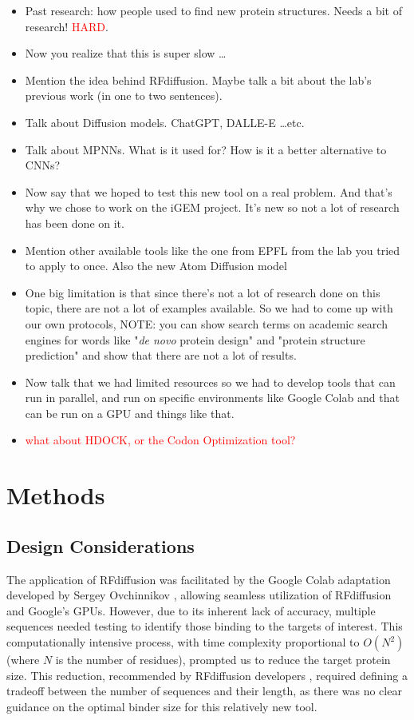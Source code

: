 \documentclass[11pt,a4paper]{article}
\begin{document}
\begin{itemize}
    \item Past research: how people used to find new protein 
    structures. Needs a bit of research! \textcolor{red}{HARD}.
    \item Now you realize that this is super slow \ldots
    \item Mention the idea behind RFdiffusion. Maybe talk a bit about 
    the lab's previous work (in one to two sentences).
    \item Talk about Diffusion models. ChatGPT, DALLE-E \ldots etc.
    \item Talk about MPNNs. What is it used for? How is it a better 
    alternative to CNNs?
    \item Now say that we hoped to test this new tool on a real 
    problem. And that's why we chose to work on the iGEM project. It's 
    new so not a lot of research has been done on it.
    \item Mention other available tools like the one from EPFL from the 
    lab you tried to apply to once. Also the new Atom Diffusion model
    \item One big limitation is that since there's not a lot of research 
    done on this topic, there are not a lot of examples available. So we 
    had to come up with our own protocols, NOTE: you can show search 
    terms on academic search engines for words like "\emph{de novo} protein 
    design" and "protein structure prediction" and show that there are 
    not a lot of results.
    \item Now talk that we had limited resources so we had to develop 
    tools that can run in parallel, and run on specific environments like 
    Google Colab and that can be run on a GPU and things like that.
    \item \textcolor{red}{what about HDOCK, or the Codon Optimization 
    tool?} 
\end{itemize}


\section{Methods}

\subsection{Design Considerations}

The application of RFdiffusion was facilitated by the Google Colab 
adaptation developed by Sergey Ovchinnikov \cite{ovchinnikov2023colab}, 
allowing seamless utilization of RFdiffusion and Google's GPUs. 
However, due to its inherent lack of accuracy, multiple sequences 
needed testing to identify those binding to the targets of interest. 
This computationally intensive process, with time complexity 
proportional to $O(N^2)$ (where $N$ is the number of residues), 
prompted us to reduce the target protein size. This reduction, 
recommended by RFdiffusion developers \cite{rfdiffusion_github}, 
required defining a tradeoff between the number of sequences and their 
length, as there was no clear guidance on the optimal binder size for 
this relatively new tool.
\end{document}
